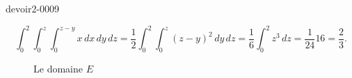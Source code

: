 \begin{corrige}{devoir2-0009}
\begin{enumerate}
\begin{equation}
  \int_0^2\int_0^z\int_0^{z-y}x\, dx\,dy\,dz=\frac{1}{2}\int_0^2\int_0^z(z-y)^2\, dy \, dz = \frac{1}{6}\int_0^2 z^3 \,dz = \frac{1}{24} 16= \frac{2}{3}.
\end{equation}
  \end{enumerate}

  \begin{figure}
    \begin{center}
      
      \caption{Le domaine $E$}\label{exo8devoir2deuxieme}
    \end{center}
  \end{figure}
   
\end{corrige}
